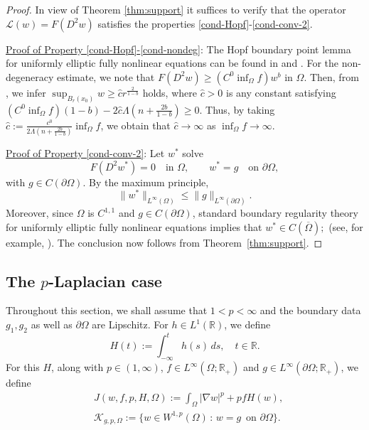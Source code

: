 \documentclass[11pt,oneside,english]{amsart}
\newcommand{\R}{{\mathbb R}}
\newcommand{\cK}{{\mathcal K}}
\newcommand{\D}{\nabla}
\numberwithin{equation}{section}
\theoremstyle{plain}
\numberwithin{equation}{section}
\begin{document}
\begin{proof}
In view of Theorem \ref{thm:support} it suffices to verify that the operator $\mathcal L(w)=F(D^2w)$
satisfies the properties \ref{cond-Hopf}-\ref{cond-conv-2}.

\medskip


\noindent
\underline{Proof of Property \ref{cond-Hopf}-\ref{cond-nondeg}}: 
The Hopf boundary point lemma for uniformly elliptic fully nonlinear equations  can be found in \cite[P. 27 and Lemma 3.4]{GT2001}
 and \cite[Lemma 1.1 and Lemma 1.2]{Safonov2010}.
For the non-degeneracy estimate, we note that $F(D^2w)\ge (C^0\inf_\Omega f)w^b$ in $\Omega$. Then, from \cite[pages 463-464]{JeoSha24}, we infer $\sup_{B_r(x_0)}w\ge \hat c r^{\frac2{1-b}}$ holds, where $\hat c>0$ is any constant satisfying $(C^0\inf_{\Omega}f)(1-b)-2\hat c\Lambda(n+\frac{2b}{1-b})\ge0$. Thus, by taking $\hat c:=\frac{c^0}{2\Lambda(n+\frac{2b}{1-b})}\inf_\Omega f$, we obtain that $\hat c\to\infty$ as $\inf_\Omega f\to\infty$.


\medskip

\noindent
\underline{Proof of Property  \ref{cond-conv-2}}: Let $w^*$ solve
\[
F(D^2w^*)=0 \quad\text{in }\Omega,\qquad w^*=g \quad\text{on }\partial\Omega,
\]
with $g\in C(\partial\Omega)$. By the maximum  principle,
\[
\|w^*\|_{L^\infty(\Omega)}
\le
\|g\|_{L^\infty(\partial\Omega)}.
\]
Moreover, since $\Omega$ is $C^{1,1}$ and $g\in C(\partial\Omega)$,
standard boundary regularity theory for uniformly elliptic fully nonlinear
equations implies that
$
w^*\in C(\overline\Omega);$ (see, for example, \cite{CC95}).
The conclusion now follows from Theorem~\ref{thm:support}.
\end{proof}






\subsection{The \texorpdfstring{$p$}{p}-Laplacian   case}\label{sec:p-lap-elliptic}
Throughout  this section, we shall assume that $1<p<\infty$ and the boundary data $g_1,g_2$ as well as  $\partial \Omega$ are Lipschitz. 
For $h\in L^1(\R)$, we define
$$
H(t):=\int_{-\infty}^th(s)\,ds,\quad t\in\R.
$$
For this $H$, along with $p\in(1,\infty)$, $f\in L^\infty(\Omega;\R_+)$ and $g\in L^\infty(\partial\Omega;\R_+)$, we define
\begin{align*}
    &J(w,f,p,H,\Omega):=\int_{\Omega}|\D w|^p+pfH(w),\\
    &\cK_{g,p,\Omega}:=\{w\in W^{1,p}(\Omega)\,:\, w=g\,\,\,\text{on }\partial\Omega\}.
\end{align*}
\end{document}
